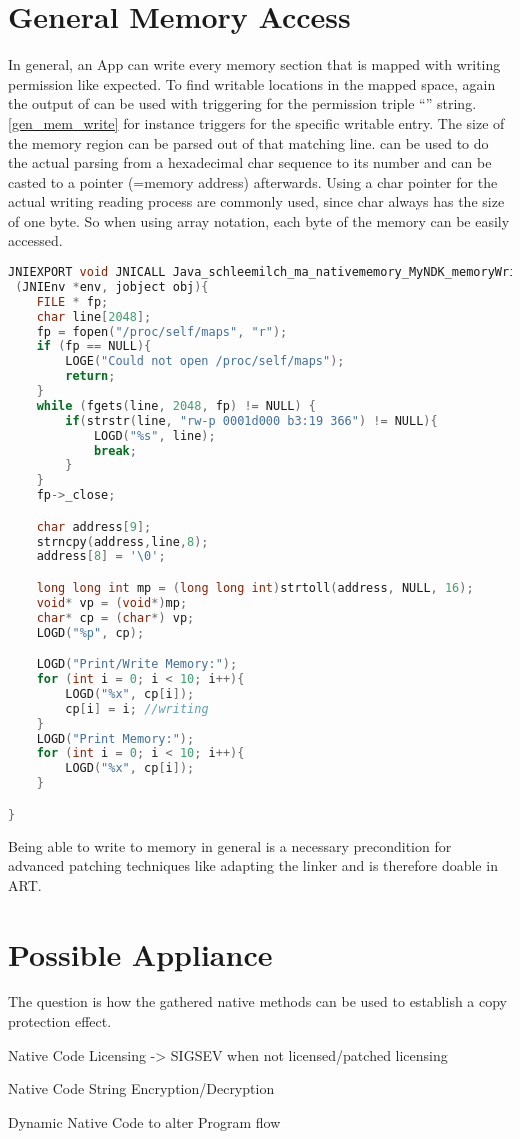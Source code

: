 \section{General Memory Access}\label{section:general_mem_access}
In general, an App can write every memory section that is mapped with writing permission like expected. To find writable locations in the mapped space, again the output of  can be used with triggering for the permission triple ``'' string. \autoref{gen_mem_write} for instance triggers for the specific writable  entry. The size of the memory region can be parsed out of that matching line.  can be used to do the actual parsing from a
hexadecimal char sequence to its  number and can be casted to a pointer (=memory address) afterwards.
Using a char pointer for the actual writing reading process
are commonly used, since char always has the size of one byte. So when using array notation, each byte of the memory can be easily accessed.
\begin{lstlisting}[language=C++, caption=memoryWriting(), label=gen_mem_write]
JNIEXPORT void JNICALL Java_schleemilch_ma_nativememory_MyNDK_memoryWriting
 (JNIEnv *env, jobject obj){
    FILE * fp;
    char line[2048];
    fp = fopen("/proc/self/maps", "r");
    if (fp == NULL){
        LOGE("Could not open /proc/self/maps");
        return;
    }
    while (fgets(line, 2048, fp) != NULL) {
        if(strstr(line, "rw-p 0001d000 b3:19 366") != NULL){
            LOGD("%s", line);
            break;
        }
    }
    fp->_close;

    char address[9];
    strncpy(address,line,8);
    address[8] = '\0';

    long long int mp = (long long int)strtoll(address, NULL, 16);
    void* vp = (void*)mp;
    char* cp = (char*) vp;
    LOGD("%p", cp);

    LOGD("Print/Write Memory:");
    for (int i = 0; i < 10; i++){
        LOGD("%x", cp[i]);
        cp[i] = i; //writing
    }
    LOGD("Print Memory:");
    for (int i = 0; i < 10; i++){
        LOGD("%x", cp[i]);
    }

}
\end{lstlisting}
Being able to write to memory in general is a necessary precondition for advanced patching techniques like adapting the linker and is therefore doable in ART.

\section{Possible Appliance}
The question is how the gathered native methods can be used to establish
a copy protection effect.

\begin{listing}
\item Native Code Licensing -> SIGSEV when not licensed/patched licensing
\item Native Code String Encryption/Decryption
\item Dynamic Native Code to alter Program flow
\end{listing}
